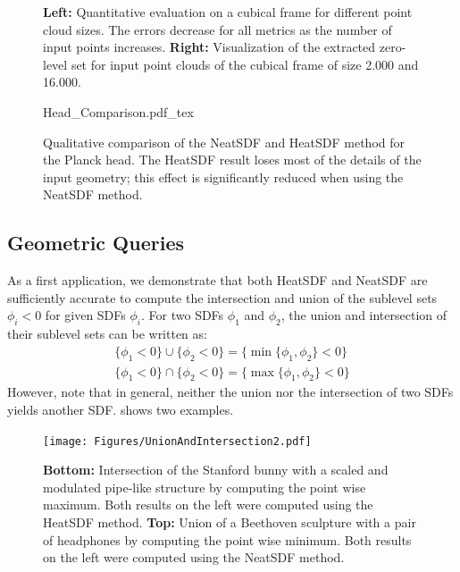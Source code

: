 \documentclass[12pt,openany]{book}
\theoremstyle{plainnormal}
\theoremstyle{remark}
\begin{document}
\begin{figure}[]
\begin{minipage}[c]{0.2\textwidth}
    \end{minipage}
    \caption{
\textbf{Left:} Quantitative evaluation on a cubical frame for different point cloud sizes. The errors decrease for all metrics as the number of input points increases. 
\textbf{Right:} Visualization of the extracted zero-level set for input point clouds of the cubical frame of size 2.000 and 16.000.}
\label{convergence}
    
\end{figure}

\begin{figure}[]
    \centering
    \begingroup
    \sffamily
    \def\svgwidth{0.95\textwidth} %
    {Head_Comparison.pdf_tex}
    \endgroup
    \caption{Qualitative comparison of the NeatSDF and HeatSDF method for the Planck head. The HeatSDF result loses most of the details of the input geometry; this effect is significantly reduced when using the NeatSDF method.}
    \label{Head_comp}
\end{figure}
\FloatBarrier

\subsection{Geometric Queries}

As a first application, we demonstrate that both HeatSDF and NeatSDF are sufficiently accurate to compute the intersection and union of the sublevel sets ${\phi_i < 0}$ for given SDFs $\phi_i$. For two SDFs $\phi_1$ and $\phi_2$, the union and intersection of their sublevel sets can be written as:
\begin{align*}
    \{\phi_1 < 0\} \cup \{\phi_2 < 0\} = \{\min\{\phi_1, \phi_2\} < 0\} \\
    \{\phi_1 < 0\} \cap \{\phi_2 < 0\} = \{\max\{\phi_1, \phi_2\} < 0\}
\end{align*}
However, note that in general, neither the union nor the intersection of two SDFs yields another SDF.  shows two examples.
\begin{figure}
    \centering
    \texttt{[image: Figures/UnionAndIntersection2.pdf]}
    \caption{\textbf{Bottom:} Intersection of the Stanford bunny with a scaled and modulated pipe-like structure by computing the point wise maximum. Both results on the left were computed using the HeatSDF method. \textbf{Top:} Union of a Beethoven sculpture with a pair of headphones by computing the point wise minimum. Both results on the left were computed using the NeatSDF method.}\label{intersAndunion}
\end{figure}
\end{document}
